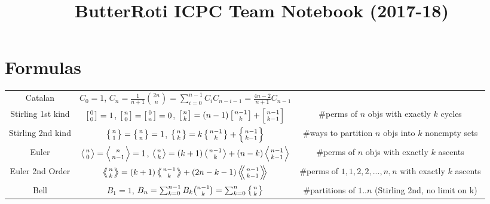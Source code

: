 \documentclass[15pt,a4paper]{article}
\title{\vspace{-4ex}\Large{ButterRoti ICPC Team Notebook (2017-18)}}
\author{}
\date{}
\begin{document}
\begin{landscape}
\begin{multicols}{2}

\maketitle
\vspace{-13ex}
\tableofcontents
\pagestyle{fancy}



\end{multicols}
\newpage
\begingroup
\fontsize{12pt}{12pt}\selectfont
\section{Formulas}
\begin{tabular}{@{}c|c|c@{}}
    \toprule
    Catalan &   $C_0=1$, $C_n=\frac{1}{n+1}\binom{2n}{n} = \sum_{i=0}^{n-1}C_iC_{n-i-1} = \frac{4n-2}{n+1}C_{n-1}$  & \\
    Stirling 1st kind & $\left[{0\atop 0}\right]=1$, $\left[{n\atop 0}\right]=\left[{0\atop n}\right]=0$, $\left[{n\atop k}\right]=(n-1)\left[{n-1\atop k}\right]+\left[{n-1\atop k-1}\right]$ & \#perms of $n$ objs with exactly $k$ cycles\\
    Stirling 2nd kind & $\left\{{n\atop 1}\right\}=\left\{{n\atop n}\right\}=1$, $\left\{{n\atop k}\right\} = k \left\{{ n-1 \atop k }\right\} + \left\{{n-1\atop k-1}\right\}$ & \#ways to partition $n$ objs into $k$ nonempty sets\\
    Euler   & $\left \langle {n\atop 0} \right \rangle = \left \langle {n\atop n-1} \right \rangle = 1 $, $\left \langle {n\atop k} \right \rangle = (k+1) \left \langle {n-1\atop {k}} \right \rangle + (n-k)\left \langle {{n-1}\atop {k-1}} \right \rangle$ & \#perms of $n$ objs with exactly $k$ ascents \\
    Euler 2nd Order &  $\left \langle \!\!\left \langle {n\atop k} \right \rangle \!\! \right \rangle = (k+1) \left \langle \!\! \left \langle {{n-1}\atop {k}} \right \rangle \!\! \right \rangle +(2n-k-1)\left \langle \!\! \left \langle {{n-1}\atop {k-1}} \right \rangle  \!\! \right \rangle$ & \#perms of ${1,1,2,2,...,n,n}$ with exactly $k$ ascents \\
    Bell & $B_1 = 1$, $B_n = \sum_{k=0}^{n-1} B_k \binom{n-1}{k} = \sum_{k=0}^n\left\{{n\atop k}\right\}$ & \#partitions of $1..n$ (Stirling 2nd, no limit on k)\\
    \bottomrule
\end{tabular}


\end{landscape}
\end{document}
